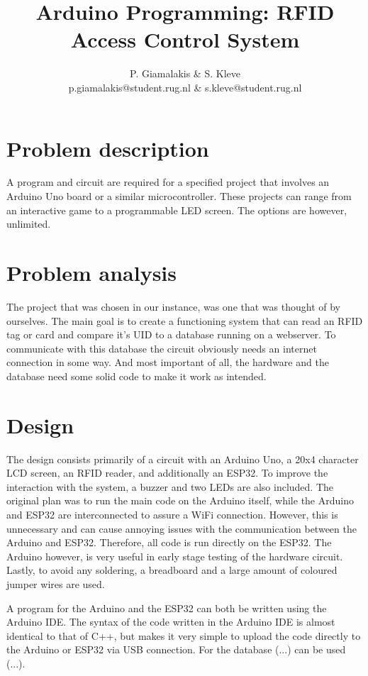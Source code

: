 \documentclass[a4paper,10pt]{article}
\title{Arduino Programming: RFID Access Control System}
\author{P. Giamalakis \& S. Kleve\\
        p.giamalakis@student.rug.nl \& s.kleve@student.rug.nl}
\begin{document}
\maketitle

\section{Problem description}
 A program and circuit are required for a specified project that involves an Arduino Uno board or a similar microcontroller.  These projects can range from an interactive game to a programmable LED screen. The options are however, unlimited.

\section{Problem analysis}
The project that was chosen in our instance, was one that was thought of by ourselves. The main goal is to create a functioning system that can read an RFID tag or card and compare it's UID to a database running on a webserver. To communicate with this database the circuit obviously needs an internet connection in some way. And most important of all, the hardware and the database need some solid code to make it work as intended.

\section{Design}
The design consists primarily of a circuit with an Arduino Uno, a 20x4 character LCD screen, an RFID reader, and additionally an ESP32. To improve the interaction with the system, a buzzer and two LEDs are also included. The original plan was to run the main code on the Arduino itself, while the Arduino and ESP32 are interconnected to assure a WiFi connection. However, this is unnecessary and can cause annoying issues with the communication between the Arduino and ESP32. Therefore, all code is run directly on the ESP32. The Arduino however, is very useful in early stage testing of the hardware circuit. Lastly, to avoid any soldering, a breadboard and a large amount of coloured jumper wires are used.

A program for the Arduino and the ESP32 can both be written using the Arduino IDE. The syntax of the code written in the Arduino IDE is almost identical to that of C++, but makes it very simple to upload the code directly to the Arduino or ESP32 via USB connection. For the database (...) can be used (...). 
\end{document}
